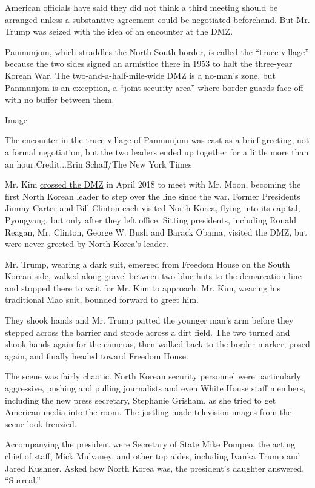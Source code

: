 American officials have said they did not think a third meeting should
be arranged unless a substantive agreement could be negotiated
beforehand. But Mr. Trump was seized with the idea of an encounter at
the DMZ.

Panmunjom, which straddles the North-South border, is called the ``truce
village'' because the two sides signed an armistice there in 1953 to
halt the three-year Korean War. The two-and-a-half-mile-wide DMZ is a
no-man's zone, but Panmunjom is an exception, a ``joint security area''
where border guards face off with no buffer between them.

Image

The encounter in the truce village of Panmunjom was cast as a brief
greeting, not a formal negotiation, but the two leaders ended up
together for a little more than an hour.Credit...Erin Schaff/The New
York Times

Mr. Kim
\href{https://www.nytimes3xbfgragh.onion/2018/04/26/world/asia/korea-kim-moon-summit.html}{crossed
the DMZ} in April 2018 to meet with Mr. Moon, becoming the first North
Korean leader to step over the line since the war. Former Presidents
Jimmy Carter and Bill Clinton each visited North Korea, flying into its
capital, Pyongyang, but only after they left office. Sitting presidents,
including Ronald Reagan, Mr. Clinton, George W. Bush and Barack Obama,
visited the DMZ, but were never greeted by North Korea's leader.

Mr. Trump, wearing a dark suit, emerged from Freedom House on the South
Korean side, walked along gravel between two blue huts to the
demarcation line and stopped there to wait for Mr. Kim to approach. Mr.
Kim, wearing his traditional Mao suit, bounded forward to greet him.

They shook hands and Mr. Trump patted the younger man's arm before they
stepped across the barrier and strode across a dirt field. The two
turned and shook hands again for the cameras, then walked back to the
border marker, posed again, and finally headed toward Freedom House.

The scene was fairly chaotic. North Korean security personnel were
particularly aggressive, pushing and pulling journalists and even White
House staff members, including the new press secretary, Stephanie
Grisham, as she tried to get American media into the room. The jostling
made television images from the scene look frenzied.

Accompanying the president were Secretary of State Mike Pompeo, the
acting chief of staff, Mick Mulvaney, and other top aides, including
Ivanka Trump and Jared Kushner. Asked how North Korea was, the
president's daughter answered, ``Surreal.''

